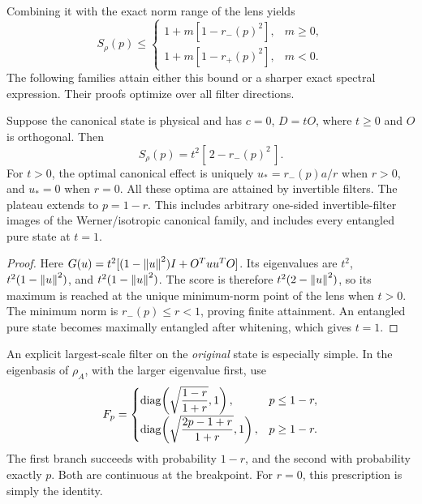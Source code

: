 Combining it with the exact norm range of the lens yields
\begin{equation}
 S_\rho(p)\le
 \begin{cases}
 1+m[1-r_-(p)^2],&m\ge0,\\
 1+m[1-r_+(p)^2],&m<0.
 \end{cases}
 \label{eq:r3-purity-frontier}
\end{equation}
The following families attain either this bound or a sharper exact
spectral expression. Their proofs optimize over all filter directions.

\begin{theorem}
\label{thm:r3-conformal}
Suppose the canonical state is physical and has $c=0$, $D=tO$,
where $t\ge0$ and $O$ is orthogonal. Then
\begin{equation}
 \boxed{\qquad S_\rho(p)=t^2[\,2-r_-(p)^2\,].\qquad}
 \label{eq:r3-conformal}
\end{equation}
For $t>0$, the optimal canonical effect is uniquely
$u_*=r_-(p)a/r$ when $r>0$, and $u_*=0$ when $r=0$.
All these optima are attained by invertible filters.
The plateau extends to $p=1-r$.
This includes arbitrary one-sided invertible-filter images of the
Werner/isotropic canonical family, and includes every entangled pure
state at $t=1$.
\end{theorem}

\begin{proof}
Here $G(u)=t^2[(1-\left\lVert u\right\rVert^2)I+O^Tuu^TO]$.
Its eigenvalues are $t^2$, $t^2(1-\left\lVert u\right\rVert^2)$, and
$t^2(1-\left\lVert u\right\rVert^2)$. The score is therefore
$t^2(2-\left\lVert u\right\rVert^2)$, so its maximum is reached at the unique
minimum-norm point of the lens when $t>0$.
The minimum norm is $r_-(p)\le r<1$, proving finite attainment.
An entangled pure state becomes maximally entangled after whitening,
which gives $t=1$.
\end{proof}

An explicit largest-scale filter on the \emph{original} state is
especially simple. In the eigenbasis of $\rho_A$, with the larger
eigenvalue first, use
\begin{equation}
 F_p=
 \begin{cases}
 \operatorname{diag}\!\left(\sqrt{\dfrac{1-r}{1+r}},1\right),&p\le1-r,\\[6pt]
 \operatorname{diag}\!\left(\sqrt{\dfrac{2p-1+r}{1+r}},1\right),&p\ge1-r.
 \end{cases}
 \label{eq:r3-concentration-filter}
\end{equation}
The first branch succeeds with probability $1-r$, and the second
with probability exactly $p$. Both are continuous at the breakpoint.
For $r=0$, this prescription is simply the identity.

